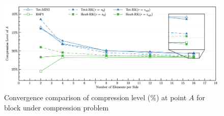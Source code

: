 \begin{figure}[H]
 \centering
\includegraphics[width=\textwidth]{png/block_convergence.png}
\caption{Convergence comparison of compression level (\%) at point $A$ for block under compression problem}\label{fg:block_convergence}
\end{figure}

